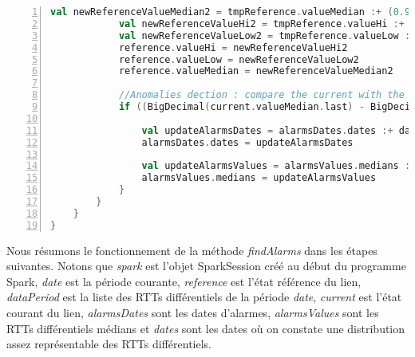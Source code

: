 \begin{lstlisting}[language=scala,firstnumber=1, caption={Définition de la méthode findAlarms},label={lst:findAlarmsFunction}, basicstyle = \footnotesize,escapechar=|,numbers=left,
stepnumber=1]
			val newReferenceValueMedian2 = tmpReference.valueMedian :+ (0.99 * tmpReference.valueMedian.last + 0.01 * current.valueMedian.last)
			val newReferenceValueHi2 = tmpReference.valueHi :+ (0.99 * tmpReference.valueHi.last + 0.01 * newDist(javatools.JavaTools.getIntegerPart(wilsonCi(1))))
			val newReferenceValueLow2 = tmpReference.valueLow :+ (0.99 * tmpReference.valueLow.last + 0.01 * newDist(javatools.JavaTools.getIntegerPart(wilsonCi(0))))
			reference.valueHi = newReferenceValueHi2
			reference.valueLow = newReferenceValueLow2
			reference.valueMedian = newReferenceValueMedian2
			
			//Anomalies dection : compare the current with the reference
			if ((BigDecimal(current.valueMedian.last) - BigDecimal(current.valueLow.last) > reference.valueHi.last || current.valueMedian.last + current.valueHi.last < reference.valueLow.last) && scala.math.abs(current.valueMedian.last - reference.valueMedian.last) > 1) {
				
				val updateAlarmsDates = alarmsDates.dates :+ date
				alarmsDates.dates = updateAlarmsDates
				
				val updateAlarmsValues = alarmsValues.medians :+ current.valueMedian.last
				alarmsValues.medians = updateAlarmsValues
			}
		}
	}
}
\end{lstlisting}

 Nous résumons le fonctionnement de la méthode \textit{findAlarms} dans les étapes suivantes. Notons que \textit{spark}  est l'objet SparkSession créé au début du programme Spark,  \textit{date} est la période courante, \textit{reference} est l'état référence du lien, \textit{dataPeriod} est la liste des RTTs différentiels de la période  \textit{date}, \textit{current} est l'état courant du lien, \textit{alarmsDates} sont les dates d'alarmes, \textit{alarmsValues} sont les RTTs différentiels médians et \textit{dates} sont les dates où on constate une distribution assez représentable des RTTs différentiels.   
 
